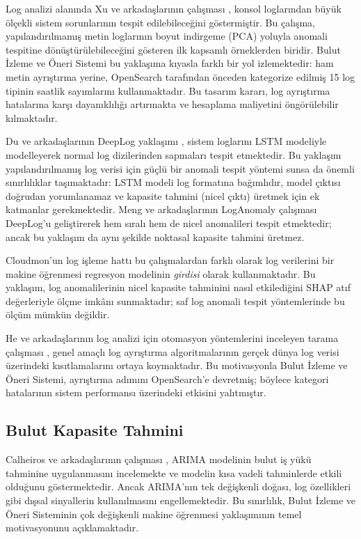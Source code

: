 Log analizi alanında Xu ve arkadaşlarının çalışması \autocite{xu2009}, konsol loglarından büyük ölçekli sistem sorunlarının tespit edilebileceğini göstermiştir.
Bu çalışma, yapılandırılmamış metin loglarının boyut indirgeme (PCA) yoluyla anomali tespitine dönüştürülebileceğini gösteren ilk kapsamlı örneklerden biridir.
Bulut İzleme ve Öneri Sistemi bu yaklaşıma kıyasla farklı bir yol izlemektedir: ham metin ayrıştırma yerine, OpenSearch tarafından önceden kategorize edilmiş 15 log tipinin saatlik sayımlarını kullanmaktadır.
Bu tasarım kararı, log ayrıştırma hatalarına karşı dayanıklılığı artırmakta ve hesaplama maliyetini öngörülebilir kılmaktadır.

Du ve arkadaşlarının DeepLog yaklaşımı \autocite{du2017}, sistem loglarını LSTM modeliyle modelleyerek normal log dizilerinden sapmaları tespit etmektedir.
Bu yaklaşım yapılandırılmamış log verisi için güçlü bir anomali tespit yöntemi sunsa da önemli sınırlılıklar taşımaktadır: LSTM modeli log formatına bağımlıdır, model çıktısı doğrudan yorumlanamaz ve kapasite tahmini (nicel çıktı) üretmek için ek katmanlar gerekmektedir.
Meng ve arkadaşlarının LogAnomaly çalışması \autocite{meng2020} DeepLog'u geliştirerek hem sıralı hem de nicel anomalileri tespit etmektedir; ancak bu yaklaşım da aynı şekilde noktasal kapasite tahmini üretmez.

Cloudmon'un log işleme hattı bu çalışmalardan farklı olarak log verilerini bir makine öğrenmesi regresyon modelinin \textit{girdisi} olarak kullanmaktadır.
Bu yaklaşım, log anomalilerinin nicel kapasite tahminini nasıl etkilediğini SHAP atıf değerleriyle ölçme imkânı sunmaktadır; saf log anomali tespit yöntemlerinde bu ölçüm mümkün değildir.

He ve arkadaşlarının log analizi için otomasyon yöntemlerini inceleyen tarama çalışması \autocite{he2021}, genel amaçlı log ayrıştırma algoritmalarının gerçek dünya log verisi üzerindeki kısıtlamalarını ortaya koymaktadır.
Bu motivasyonla Bulut İzleme ve Öneri Sistemi, ayrıştırma adımını OpenSearch'e devretmiş; böylece kategori hatalarının sistem performansı üzerindeki etkisini yalıtmıştır.

\subsection{Bulut Kapasite Tahmini}

Calheiros ve arkadaşlarının çalışması \autocite{calheiros2015}, ARIMA modelinin bulut iş yükü tahminine uygulanmasını incelemekte ve modelin kısa vadeli tahminlerde etkili olduğunu göstermektedir.
Ancak ARIMA'nın tek değişkenli doğası, log özellikleri gibi dışsal sinyallerin kullanılmasını engellemektedir.
Bu sınırlılık, Bulut İzleme ve Öneri Sisteminin çok değişkenli makine öğrenmesi yaklaşımının temel motivasyonunu açıklamaktadır.

